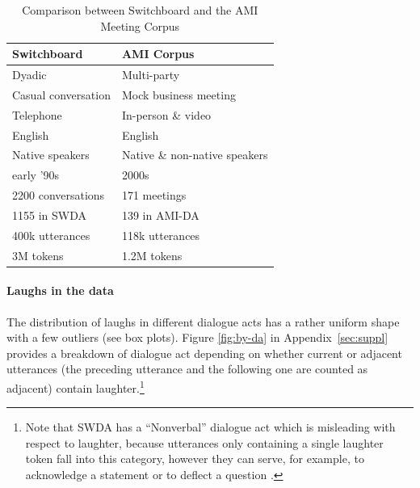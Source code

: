 \documentclass[11pt,a4paper]{article}
\begin{document}
\begin{table}[]
\centering
\begin{tabular}{@{}ll@{}}
\toprule
\textbf{Switchboard}       & \textbf{AMI Corpus}                     \\ \midrule
Dyadic                     & Multi-party                             \\
Casual conversation        & Mock business meeting                   \\
Telephone                  & In-person \& video                      \\ \midrule
English                    & English                                 \\ 
Native speakers            & Native \& non-native speakers           \\ 
early '90s                 & 2000s                                   \\ \midrule
2200 conversations         & 171 meetings                            \\
  \hspace{1em} 1155 in SWDA               & \hspace{1em} 139 in AMI-DA                           \\
400k utterances             & 118k utterances                         \\
3M tokens                  & 1.2M tokens                             \\ \bottomrule
\end{tabular}
  \caption{Comparison between Switchboard and the AMI Meeting Corpus}
  \label{table:corpora}
\end{table}

\paragraph{Laughs in the data}
The distribution of laughs in different dialogue acts has a rather uniform shape with a few outliers (see box plots). Figure \ref{fig:by-da} in Appendix~\ref{sec:suppl} provides a breakdown of dialogue act depending on whether current or adjacent utterances (the preceding utterance and the following one are counted as adjacent) contain laughter.\footnote{Note that SWDA has a ``Nonverbal'' dialogue act which is misleading with respect to laughter, because utterances only containing a single laughter token fall into this category, however they can serve, for example, to acknowledge a statement or to deflect a question  \citep{mazzocconi2019phd}.}
\end{document}
